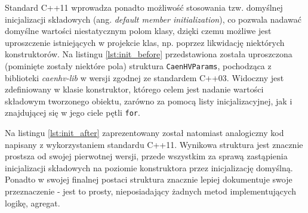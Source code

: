 \clearpage



Standard C++11 wprowadza ponadto możliwość stosowania tzw. domyślnej inicjalizacji składowych (ang. \emph{default member initialization}), co pozwala nadawać domyślne wartości niestatycznym polom klasy, dzięki czemu możliwe jest uproszczenie istniejących w projekcie klas, np. poprzez likwidację niektórych konstruktorów. Na listingu \ref{lst:init_before} przedstawiona została uproszczona (pominięte zostały niektóre pola) struktura \lstinline{CaenHVParams}, pochodząca z biblioteki \emph{caenhv-lib} w wersji zgodnej ze standardem C++03. Widoczny jest zdefiniowany w klasie konstruktor, którego celem jest nadanie wartości składowym tworzonego obiektu, zarówno za pomocą listy inicjalizacyjnej, jak i znajdującej się w jego ciele pętli \lstinline{for}.





Na listingu \ref{lst:init_after} zaprezentowany został natomiast analogiczny kod napisany z wykorzystaniem standardu C++11. Wynikowa struktura jest znacznie prostsza od swojej pierwotnej wersji, przede wszystkim za sprawą zastąpienia inicjalizacji składowych na poziomie konstruktora przez inicjalizację domyślną. Ponadto w swojej finalnej postaci struktura znacznie lepiej dokumentuje swoje przeznaczenie - jest to prosty, nieposiadający żadnych metod implementujących logikę, agregat. 

\clearpage


